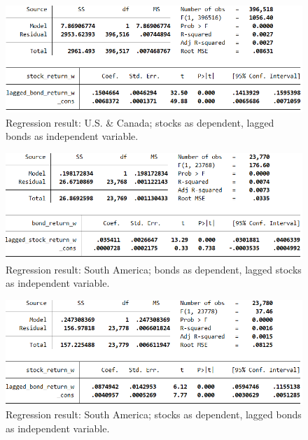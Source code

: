 \begin{figure}[h]
	\centering
	\includegraphics[width=1.0\linewidth]{figures/regression-results/regression-na-stocks-as-dependent.PNG}
	\caption{Regression result: U.S. \& Canada; stocks as dependent, lagged bonds as independent variable. }
	\label{fig:regression-na-stocks-as-dependent}
\end{figure}

\begin{figure}[h]
	\centering
	\includegraphics[width=1.0\linewidth]{figures/regression-results/regression-sa-bonds-as-dependent.PNG}
	\caption{Regression result: South America; bonds as dependent, lagged stocks as independent variable. }
	\label{fig:regression-sa-bonds-as-dependent}
\end{figure}

\begin{figure}[h]
	\centering
	\includegraphics[width=1.0\linewidth]{figures/regression-results/regression-sa-stocks-as-dependent.PNG}
	\caption{Regression result: South America; stocks as dependent, lagged bonds as independent variable. }
	\label{fig:regression-sa-stocks-as-dependent}
\end{figure}

